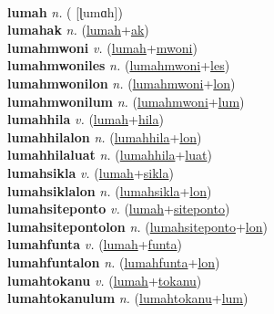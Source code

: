  \label{lum} \\
\textbf{lumah} \textit{n.} ( [ɭumɑh])
 \label{lumah} \\
\textbf{lumahak} \textit{n.} (\hyperref[lumah]{lumah}+\hyperref[ak]{ak})
 \label{lumahak} \\
\textbf{lumahmwoni} \textit{v.} (\hyperref[lumah]{lumah}+\hyperref[mwoni]{mwoni})
 \label{lumahmwoni} \\
\textbf{lumahmwoniles} \textit{n.} (\hyperref[lumahmwoni]{lumahmwoni}+\hyperref[les]{les})
 \label{lumahmwoniles} \\
\textbf{lumahmwonilon} \textit{n.} (\hyperref[lumahmwoni]{lumahmwoni}+\hyperref[lon]{lon})
 \label{lumahmwonilon} \\
\textbf{lumahmwonilum} \textit{n.} (\hyperref[lumahmwoni]{lumahmwoni}+\hyperref[lum]{lum})
 \label{lumahmwonilum} \\
\textbf{lumahhila} \textit{v.} (\hyperref[lumah]{lumah}+\hyperref[hila]{hila})
 \label{lumahhila} \\
\textbf{lumahhilalon} \textit{n.} (\hyperref[lumahhila]{lumahhila}+\hyperref[lon]{lon})
 \label{lumahhilalon} \\
\textbf{lumahhilaluat} \textit{n.} (\hyperref[lumahhila]{lumahhila}+\hyperref[luat]{luat})
 \label{lumahhilaluat} \\
\textbf{lumahsikla} \textit{v.} (\hyperref[lumah]{lumah}+\hyperref[sikla]{sikla})
 \label{lumahsikla} \\
\textbf{lumahsiklalon} \textit{n.} (\hyperref[lumahsikla]{lumahsikla}+\hyperref[lon]{lon})
 \label{lumahsiklalon} \\
\textbf{lumahsiteponto} \textit{v.} (\hyperref[lumah]{lumah}+\hyperref[siteponto]{siteponto})
 \label{lumahsiteponto} \\
\textbf{lumahsitepontolon} \textit{n.} (\hyperref[lumahsiteponto]{lumahsiteponto}+\hyperref[lon]{lon})
 \label{lumahsitepontolon} \\
\textbf{lumahfunta} \textit{v.} (\hyperref[lumah]{lumah}+\hyperref[funta]{funta})
 \label{lumahfunta} \\
\textbf{lumahfuntalon} \textit{n.} (\hyperref[lumahfunta]{lumahfunta}+\hyperref[lon]{lon})
 \label{lumahfuntalon} \\
\textbf{lumahtokanu} \textit{v.} (\hyperref[lumah]{lumah}+\hyperref[tokanu]{tokanu})
 \label{lumahtokanu} \\
\textbf{lumahtokanulum} \textit{n.} (\hyperref[lumahtokanu]{lumahtokanu}+\hyperref[lum]{lum})
 \label{lumahtokanulum} \\
